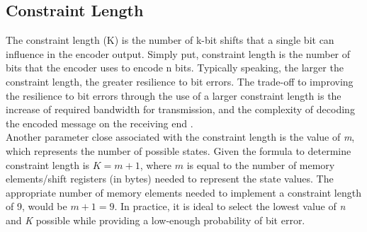 \documentclass[conference]{IEEEtran}
\begin{document}
 \subsection{Constraint Length}
 The constraint length (K) is the number of k-bit shifts that a single bit can influence in the encoder output. Simply put, constraint length is the number of bits that the encoder uses to encode n bits. Typically speaking, the larger the constraint length, the greater resilience to bit errors. The trade-off to improving the resilience to bit errors through the use of a larger constraint length is the increase of required bandwidth for transmission, and the complexity of decoding the encoded message on the receiving end \cite{b2}.\\
 
 Another parameter close associated with the constraint length is the value of \textit{m}, which represents the number of possible states. Given the formula to determine constraint length is $K = m + 1$, where $m$ is equal to the number of memory elements/shift registers (in bytes) needed to represent the state values. The appropriate number of memory elements needed to implement a constraint length of 9, would be $m + 1 =9$. In practice, it is ideal to select the lowest value of \textit{n} and \textit{K} possible while providing a low-enough probability of bit error.
\end{document}
